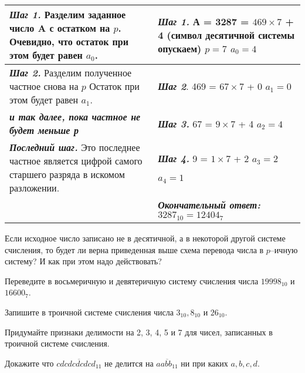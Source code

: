 \begin{center}
\begin{tabular}{|m{7.5cm}|m{9cm}|}
        \hline      
    \textbf{\textit{Шаг 1.}} Разделим заданное число A с остатком на $p$. Очевидно, что остаток при этом будет равен $a_0$. & \textbf{\textit{Шаг 1.}} А = 3287 = $469 \times 7$ + 4 (символ десятичной системы опускаем) \hfill $p = 7$ \hfill $a_0 = 4$ \\
        \hline
    \textbf{\textit{Шаг 2.}} Разделим полученное частное снова на $p$
    Остаток при этом будет равен $a_1$. & \textbf{\textit{Шаг 2}}. 469 = $67 \times 7$ + 0 \hfill  $a_1 = 0$ \\
        \hline
    \textbf{\textit{и так далее, пока частное не будет меньше р}} & \textbf{\textit{Шаг 3.}} 67 = $9 \times 7$ + 4 \hfill $a_2 = 4$ \\
        \hline
    \textbf{\textit{Последний шаг.}} Это последнее частное является цифрой самого старшего разряда в искомом разложении. & \textbf{\textit{Шаг 4.}} 9 = $1 \times 7$ + 2 \hfill  $a_3 = 2$ \par
    \hfill $a_4 = 1$ \\
    \hline
     & \textbf{\textit{Окончательный ответ:}} $3287_{10} = 12404_7$ \\
     \hline
\end{tabular}
\end{center}

\begin{ques}
    Если исходное число записано не в десятичной, а в некоторой другой системе счисления, то будет ли верна приведенная выше схема перевода числа в $p$--ичную систему? И как при этом надо действовать?
\end{ques}

\begin{ex}
    Переведите в восьмеричную и девятеричную систему счисления числа $19998_{10}$ и $16600_7$.
\end{ex}

\begin{ex}
    Запишите в троичной системе счисления числа $3_{10}, 8_{10}$ и $26_{10}$.
\end{ex}

\begin{thm}
    Придумайте признаки делимости на 2, 3, 4, 5 и 7 для чисел, записанных в троичной системе счисления.
\end{thm}

\begin{thm}
    Докажите что $\overline{cdcdcdcdcd_{11}}$ не делится на $\overline{aabb_{11}}$ ни при каких $a, b, c, d$.
\end{thm}

